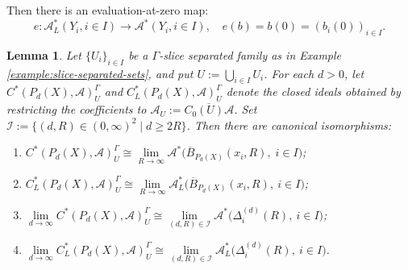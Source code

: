 \documentclass[pdflatex]{sn-jnl}
\theoremstyle{plain}
\newtheorem{lemma}[theorem]{Lemma}
\theoremstyle{definition}
\begin{document}
Then there is an evaluation-at-zero map:
\[e:\mathcal{A}_L^{*}(Y_i,i\in I)\longrightarrow \mathcal{A}^{*}(Y_i,i\in I),\quad e(b)=b(0)=(b_{i}(0))_{i\in I}.\]

\begin{lemma}\label{lemma 3.16}
Let $\{U_i\}_{i\in I}$ be a $\Gamma$-slice separated family
as in Example \ref{example:slice-separated-sets}, and put
$U:=\bigcup_{i\in I}U_i$.
For each $d>0$, let
$C^{*}(P_{d}(X),\mathcal{A})^\Gamma_U$
and
$C_L^{*}(P_{d}(X),\mathcal{A})^\Gamma_U$
denote the closed ideals obtained by restricting the coefficients
to
$\mathcal{A}_U:=\overline{C_0(U)\mathcal{A}}$.
Set
$\mathcal{I}:=
\{(d,R)\in(0,\infty)^2\mid d\geq2R\}$. Then there are canonical 
isomorphisms:
\begin{enumerate}
\item[(1)] $C^{*}(P_{d}(X),\mathcal{A})^{\Gamma}_{U} \cong \lim\limits_{R\to\infty} \mathcal{A}^{*}\bigl(\overline{B}_{P_{d}(X)}(x_{i},R),\; i\in I\bigr)$;
\item[(2)] $C^{*}_{L}(P_{d}(X),\mathcal{A})^{\Gamma}_{U}\cong \lim\limits_{R\to\infty} \mathcal{A}^{*}_{L}\bigl(\overline{B}_{P_{d}(X)}(x_{i},R),\ i\in I\bigr)$;
\item[(3)] $\lim\limits_{d\to\infty} C^{*}(P_{d}(X),\mathcal{A})^{\Gamma}_{U} \cong \lim\limits_{(d,R)\in \mathcal{I}} \mathcal{A}^{*}\bigl(\Delta_i^{(d)}(R),\ i\in I\bigr)$;
\item[(4)] $\lim\limits_{d\to\infty}C_{L}^{*}(P_{d}(X),\mathcal{A})^{\Gamma}_{U} \cong \lim\limits_{(d,R)\in \mathcal{I}} \mathcal{A}^{*}_{L}\bigl(\Delta_i^{(d)}(R),\ i\in I\bigr)$.
\end{enumerate}
\end{lemma}
\end{document}

